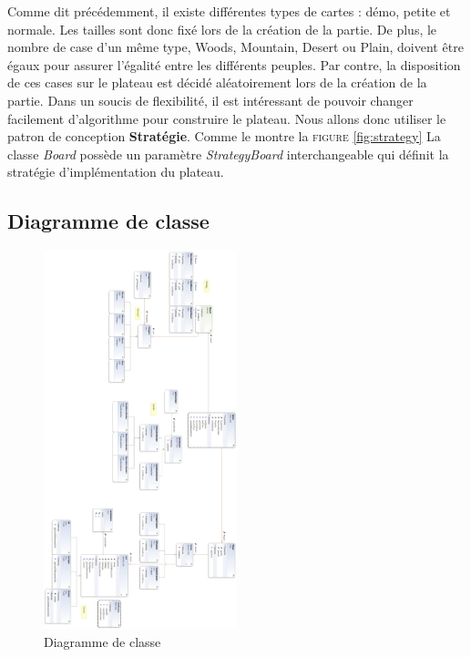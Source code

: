 		Comme dit précédemment, il existe différentes types de cartes : démo, petite et normale. Les tailles sont donc fixé lors de la création de la partie. De plus, le nombre de case d'un même type, Woods, Mountain, Desert ou Plain, doivent être égaux pour assurer l'égalité entre les différents peuples. Par contre, la disposition de ces cases sur le plateau est décidé aléatoirement lors de la création de la partie. Dans un soucis de flexibilité, il est intéressant de pouvoir changer facilement d'algorithme pour construire le plateau. Nous allons donc utiliser le patron de conception \textbf{Stratégie}. Comme le montre la \textsc{figure} \ref{fig:strategy} La classe \emph{Board} possède un paramètre \emph{StrategyBoard} interchangeable qui définit la stratégie d'implémentation du plateau. 

	\subsection{Diagramme de classe}


	\begin{figure}
		\begin{center}
			\includegraphics[width=0.5\textwidth]{figure/entire_class_diagram}
		\end{center}
		\caption{Diagramme de classe}
		\label{fig:class_global}
	\end{figure}





